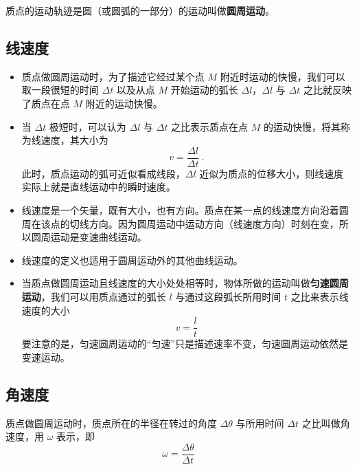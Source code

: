 

质点的运动轨迹是圆（或圆弧的一部分）的运动叫做\textbf{圆周运动}。

\subsection{线速度}

\begin{itemize}
\item 质点做圆周运动时，为了描述它经过某个点 $M$ 附近时运动的快慢，我们可以取一段很短的时间 $\Delta t$ 以及从点 $M$ 开始运动的弧长 $\Delta l$，$\Delta l$ 与 $\Delta t$ 之比就反映了质点在点 $M$ 附近的运动快慢。

\item 当 $\Delta t$ 极短时，可以认为 $\Delta l$ 与 $\Delta t$ 之比表示质点在点 $M$ 的运动快慢，将其称为线速度，其大小为
\begin{equation}
v=\frac{\Delta l}{\Delta t}~.
\end{equation}
此时，质点运动的弧可近似看成线段，$\Delta l$ 近似为质点的位移大小，则线速度实际上就是直线运动中的瞬时速度。

\item 线速度是一个矢量，既有大小，也有方向。质点在某一点的线速度方向沿着圆周在该点的切线方向。因为圆周运动中运动方向（线速度方向）时刻在变，所以圆周运动是变速曲线运动。

\item 线速度的定义也适用于圆周运动外的其他曲线运动。

\item 当质点做圆周运动且线速度的大小处处相等时，物体所做的运动叫做\textbf{匀速圆周运动}，我们可以用质点通过的弧长 $l$ 与通过这段弧长所用时间 $t$ 之比来表示线速度的大小
\begin{equation}
v=\frac{l}{t}
\end{equation}
要注意的是，匀速圆周运动的“匀速”只是描述速率不变，匀速圆周运动依然是变速运动。
\end{itemize}

\subsection{角速度}

质点做圆周运动时，质点所在的半径在转过的角度 $\Delta \theta$ 与所用时间 $\Delta t$ 之比叫做角速度，用 $\omega$ 表示，即
\begin{equation}
\omega = \frac{\Delta \theta}{\Delta t}
\end{equation}

